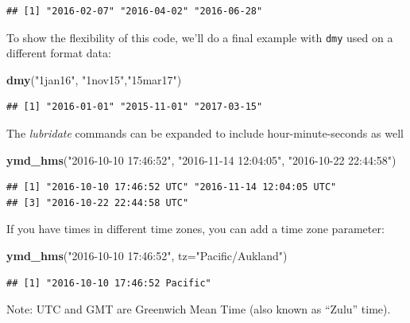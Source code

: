 \documentclass[]{book}
\newenvironment{Shaded}{\begin{snugshade}}{\end{snugshade}}
\newcommand{\KeywordTok}[1]{\textcolor[rgb]{0.13,0.29,0.53}{\textbf{{#1}}}}
\newcommand{\DataTypeTok}[1]{\textcolor[rgb]{0.13,0.29,0.53}{{#1}}}
\newcommand{\StringTok}[1]{\textcolor[rgb]{0.31,0.60,0.02}{{#1}}}
\newcommand{\NormalTok}[1]{{#1}}
\begin{document}
\begin{verbatim}
## [1] "2016-02-07" "2016-04-02" "2016-06-28"
\end{verbatim}

To show the flexibility of this code, we'll do a final example with
\texttt{dmy} used on a different format data:

\begin{Shaded}
\begin{Highlighting}[]
\KeywordTok{dmy}\NormalTok{(}\StringTok{"1jan16"}\NormalTok{, }\StringTok{"1nov15"}\NormalTok{,}\StringTok{"15mar17"}\NormalTok{)}
\end{Highlighting}
\end{Shaded}

\begin{verbatim}
## [1] "2016-01-01" "2015-11-01" "2017-03-15"
\end{verbatim}

The \emph{lubridate} commands can be expanded to include
hour-minute-seconds as well

\begin{Shaded}
\begin{Highlighting}[]
\KeywordTok{ymd_hms}\NormalTok{(}\StringTok{"2016-10-10 17:46:52"}\NormalTok{, }\StringTok{"2016-11-14 12:04:05"}\NormalTok{, }\StringTok{"2016-10-22 22:44:58"}\NormalTok{)}
\end{Highlighting}
\end{Shaded}

\begin{verbatim}
## [1] "2016-10-10 17:46:52 UTC" "2016-11-14 12:04:05 UTC"
## [3] "2016-10-22 22:44:58 UTC"
\end{verbatim}

If you have times in different time zones, you can add a time zone
parameter:

\begin{Shaded}
\begin{Highlighting}[]
\KeywordTok{ymd_hms}\NormalTok{(}\StringTok{"2016-10-10 17:46:52"}\NormalTok{, }\DataTypeTok{tz=}\StringTok{"Pacific/Aukland"}\NormalTok{)}
\end{Highlighting}
\end{Shaded}

\begin{verbatim}
## [1] "2016-10-10 17:46:52 Pacific"
\end{verbatim}

Note: UTC and GMT are Greenwich Mean Time (also known as ``Zulu'' time).
\end{document}
